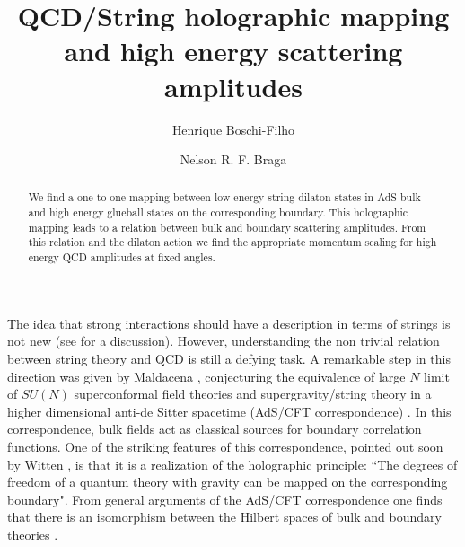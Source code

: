 \documentclass[a4paper,twocolumn,prd,groupedaddress,nofootinbib]{revtex4}
\begin{document}
\title{
QCD/String holographic mapping and high energy scattering amplitudes}


\author{Henrique Boschi-Filho}
\author{Nelson R. F. Braga}

 
\begin{abstract}
We find a one to one mapping between low energy string dilaton states
in AdS bulk and high energy glueball states on the corresponding boundary. 
This holographic mapping leads to a relation between bulk and boundary 
scattering amplitudes. From this relation and the dilaton action we find 
the appropriate momentum scaling for high energy QCD amplitudes at fixed 
angles.  
\end{abstract}

\maketitle



\vfill\eject

The idea that strong interactions should have a description in terms 
of strings is not new \cite{Planar} (see \cite{Pol} for a discussion). 
However, understanding the non trivial relation between string theory 
and QCD is still a defying task.  
A remarkable step in this direction was given by Maldacena \cite{Malda}, 
conjecturing the equivalence of large $N$ limit of $SU(N)$ 
superconformal field theories and 
supergravity/string theory in a higher dimensional anti-de 
Sitter spacetime (AdS/CFT correspondence) \cite{GKP,Wi,Malda2}.  
In this correspondence, bulk fields act as classical sources for boundary 
correlation functions\cite{GKP,Wi,Malda2,MV,FMMR}.
One of the striking features of this  correspondence, pointed out soon by 
Witten \cite{Wi}, is that it is a realization of the holographic principle: 
``The degrees of freedom of  a quantum theory with gravity can be mapped 
on the corresponding boundary"\cite{HOL1,HOL2,HOL3,HOL4,HOL5}. 
From general arguments of the AdS/CFT correspondence one finds that there 
is an isomorphism between the Hilbert spaces of bulk and boundary  
theories \cite{HS1,HS2,HS3,HS4}. 
\end{document}
